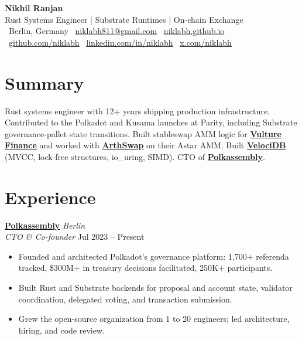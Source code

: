 \documentclass[10pt,a4paper]{article}
\newcommand{\role}[4]{%
    \textbf{#1} \hfill {\color{muted}\textit{#4}}\\
    {\color{primary}\textit{#2}} \hfill {\color{muted}\small #3}\\
    \vspace{-2pt}
}
\newenvironment{bullets}{%
  \begin{itemize}[leftmargin=14pt, itemsep=0.5pt, parsep=0pt, topsep=1pt]%
}{\end{itemize}}
\begin{document}
\begin{center}
    {\huge\bfseries Nikhil Ranjan}\\[1pt]
    {\color{muted}\small Rust Systems Engineer | Substrate Runtimes | On-chain Exchange}\\[4pt]
    \small
    \faMapMarker*\ Berlin, Germany \quad
    \faEnvelope\ \href{mailto:niklabh811@gmail.com}{niklabh811@gmail.com} \quad
    \faGlobe\ \href{https://niklabh.github.io}{niklabh.github.io} \\[2pt]
    \faGithub\ \href{https://github.com/niklabh}{github.com/niklabh} \quad
    \faLinkedin\ \href{https://www.linkedin.com/in/niklabh/}{linkedin.com/in/niklabh} \quad
    \faTwitter\ \href{https://x.com/niklabh}{x.com/niklabh}
\end{center}

\section{Summary}
Rust systems engineer with 12+ years shipping production infrastructure. Contributed to the Polkadot and Kusama launches at Parity, including Substrate governance-pallet state transitions. Built stableswap AMM logic for \href{https://vulture.finance}{\textbf{Vulture Finance}} and worked with \href{https://www.arthswap.org}{\textbf{ArthSwap}} on their Astar AMM. Built \href{https://github.com/niklabh/velocidb}{\textbf{VelociDB}} (MVCC, lock-free structures, io\_uring, SIMD). CTO of \href{https://polkassembly.io}{\textbf{Polkassembly}}.

\section{Experience}

\role{\href{https://polkassembly.io/}{Polkassembly}}{CTO \& Co-founder}{Jul 2023 -- Present}{Berlin}
\begin{bullets}
    \item Founded and architected Polkadot's governance platform: 1,700+ referenda tracked, \$300M+ in treasury decisions facilitated, 250K+ participants.
    \item Built Rust and Substrate backends for proposal and account state, validator coordination, delegated voting, and transaction submission.
    \item Grew the open-source organization from 1 to 20 engineers; led architecture, hiring, and code review.
\end{bullets}
\end{document}
